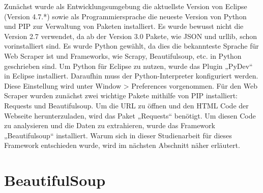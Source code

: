 \documentclass[a4paper,oneside,12pt]{report}
\begin{document}
			Zunächst wurde als Entwicklungsumgebung die aktuellste Version von Eclipse (Version 4.7.*) sowie als Programmiersprache die neueste Version von Python und PIP zur Verwaltung von Paketen installiert. Es wurde bewusst nicht die Version 2.7 verwendet, da ab der Version 3.0 Pakete, wie JSON und urllib, schon vorinstalliert sind. Es wurde Python gewählt, da dies die bekannteste Sprache für Web Scraper ist und Frameworks, wie Scrapy, Beautifulsoup, etc. in Python geschrieben sind. 
			\newline
			Um Python für Eclipse zu nutzen, wurde das Plugin „PyDev“ in Eclipse installiert. Daraufhin muss der Python-Interpreter konfiguriert werden. Diese Einstellung wird unter Window > Preferences vorgenommen. \cite{bib-pipEnv}
			\newline
			Für den Web Scraper wurden zunächst zwei wichtige Pakete mithilfe von PIP installiert: Requests und Beautifulsoup.
			Um die URL zu öffnen und den HTML Code der Webseite herunterzuladen, wird das Paket „Requests“ benötigt. Um diesen Code zu analysieren und die Daten zu extrahieren, wurde das Framework „Beautifulsoup“ installiert. \cite{bib-scrapeHero} 
			Warum sich in dieser Studienarbeit für dieses Framework entschieden wurde, wird im nächsten Abschnitt näher erläutert. 

	
		\section{BeautifulSoup}
		
\end{document}
